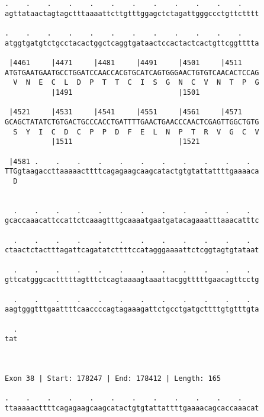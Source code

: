 \documentclass{article}
\begin{document}
\begin{Verbatim}
.    .    .    .    .    .    .    .    .    .    .    .    
agttataactagtagctttaaaattcttgtttggagctctagattgggccctgttctttt
                                                            
.    .    .    .    .    .    .    .    .    .    .    .    
atggtgatgtctgcctacactggctcaggtgataactccactactcactgttcggtttta
                                                            
 |4461     |4471     |4481     |4491     |4501     |4511    
ATGTGAATGAATGCCTGGATCCAACCACGTGCATCAGTGGGAACTGTGTCAACACTCCAG
  V  N  E  C  L  D  P  T  T  C  I  S  G  N  C  V  N  T  P  G
           |1491                         |1501              
  
 |4521     |4531     |4541     |4551     |4561     |4571    
GCAGCTATATCTGTGACTGCCCACCTGATTTTGAACTGAACCCAACTCGAGTTGGCTGTG
  S  Y  I  C  D  C  P  P  D  F  E  L  N  P  T  R  V  G  C  V
           |1511                         |1521              
  
 |4581 .    .    .    .    .    .    .    .    .    .    .  
TTGgtaagaccttaaaaacttttcagagaagcaagcatactgtgtattattttgaaaaca
  D                                                         
                                                            
  
  .    .    .    .    .    .    .    .    .    .    .    .  
gcaccaaacattccattctcaaagtttgcaaaatgaatgatacagaaatttaaacatttc
                                                            
  .    .    .    .    .    .    .    .    .    .    .    .  
ctaactctactttagattcagatatcttttccatagggaaaattctcggtagtgtataat
                                                            
  .    .    .    .    .    .    .    .    .    .    .    .  
gttcatgggcactttttagtttctcagtaaaagtaaattacggtttttgaacagttcctg
                                                            
  .    .    .    .    .    .    .    .    .    .    .    .  
aagtgggtttgaattttcaaccccagtagaaagattctgcctgatgcttttgtgtttgta
                                                            
  .
tat
   
   
 
Exon 38 | Start: 178247 | End: 178412 | Length: 165
 
.    .    .    .    .    .    .    .    .    .    .    .    
ttaaaaacttttcagagaagcaagcatactgtgtattattttgaaaacagcaccaaacat
                                                            

\end{Verbatim}
\end{document}
